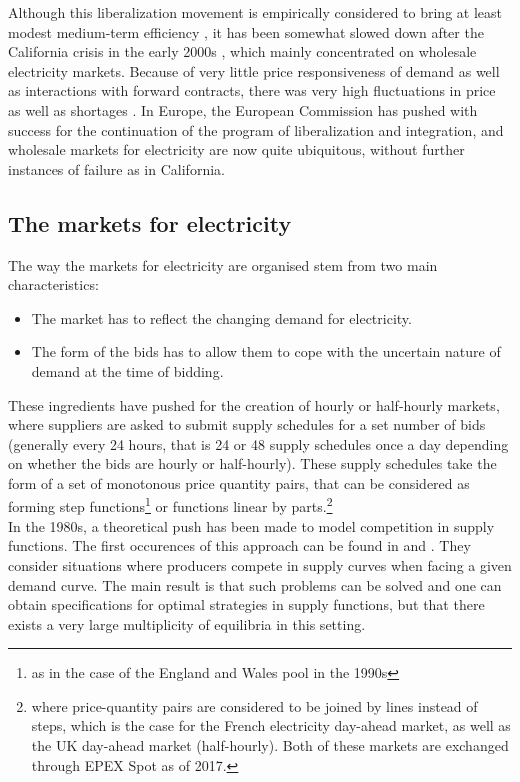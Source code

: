 Although this liberalization movement is empirically considered to bring at least modest medium-term efficiency \cite{fabrizio2007markets}, it has been somewhat slowed down after the California crisis in the early 2000s \cite{jamasb2005electricity}, which mainly concentrated on wholesale electricity markets. Because of very little price responsiveness of demand as well as interactions with forward contracts, there was very high fluctuations in price as well as shortages \cite{borenstein2002trouble}. In Europe, the European Commission has pushed with success for the continuation of the program of liberalization and integration, and wholesale markets for electricity are now quite ubiquitous, without further instances of failure as in California. 

\subsection*{The markets for electricity}
The way the markets for electricity are organised stem from two main characteristics:
\begin{itemize}
\item The market has to reflect the changing demand for electricity.
\item The form of the bids has to allow them to cope with the uncertain nature of demand at the time of bidding.
\end{itemize}

These ingredients have pushed for the creation of hourly or half-hourly markets, where suppliers are asked to submit supply schedules for a set number of bids (generally every 24 hours, that is 24 or 48 supply schedules once a day depending on whether the bids are hourly or half-hourly). These supply schedules take the form of a set of monotonous price quantity pairs, that can be considered as forming step functions\footnote{as in the case of the England and Wales pool in the 1990s} or functions linear by parts.\footnote{where price-quantity pairs are considered to be joined by lines instead of steps, which is the case for the French electricity day-ahead market, as well as the UK day-ahead market (half-hourly). Both of these markets are exchanged through EPEX Spot as of 2017.}\\

In the 1980s, a theoretical push has been made to model competition in supply functions. The first occurences of this approach can be found in \cite{grossman1981nash} and \cite{hart1982imperfect}. They consider situations where producers compete in supply curves when facing a given demand curve. The main result is that such problems can be solved and one can obtain specifications for optimal strategies in supply functions, but that there exists a very large multiplicity of equilibria in this setting.\\

